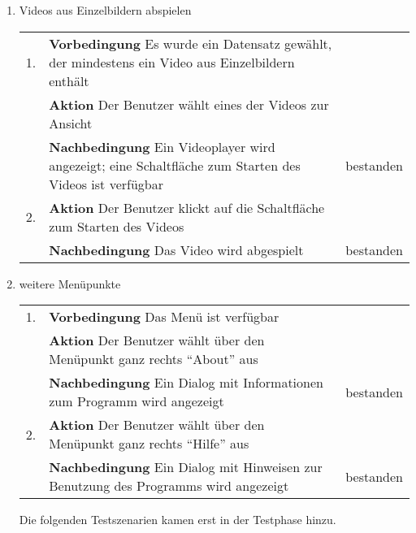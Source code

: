 \begin{enumerate} [label=\bfseries /TS \arabic*0/, leftmargin=*]
	\item Videos aus Einzelbildern abspielen \newline \newline
	\begin{tabular}{rp{4in}|l}
	1. & \textbf{Vorbedingung} Es wurde ein Datensatz gewählt, der mindestens ein Video aus Einzelbildern enthält & \\
	   & \textbf{Aktion} Der Benutzer wählt eines der Videos zur Ansicht & \\
	   & \textbf{Nachbedingung} Ein Videoplayer wird angezeigt; eine Schaltfläche zum Starten des Videos ist verfügbar & bestanden \\
	\hline
	2. & \textbf{Aktion} Der Benutzer klickt auf die Schaltfläche zum Starten des Videos & \\
	   & \textbf{Nachbedingung} Das Video wird abgespielt & bestanden \\
	\end{tabular}
	\newline

	\item weitere Menüpunkte \newline \newline
	\begin{tabular}{rp{4in}|l}
	1. & \textbf{Vorbedingung} Das Menü ist verfügbar & \\
	   & \textbf{Aktion} Der Benutzer wählt über den Menüpunkt ganz rechts \enquote{About} aus & \\
	   & \textbf{Nachbedingung} Ein Dialog mit Informationen zum Programm wird angezeigt & bestanden \\
	\hline
	2. & \textbf{Aktion} Der Benutzer wählt über den Menüpunkt ganz rechts \enquote{Hilfe} aus & \\
	   & \textbf{Nachbedingung} Ein Dialog mit Hinweisen zur Benutzung des Programms wird angezeigt & bestanden \\
	\end{tabular}
	\newline

	\newpage
	Die folgenden Testszenarien kamen erst in der Testphase hinzu.


\end{enumerate}
